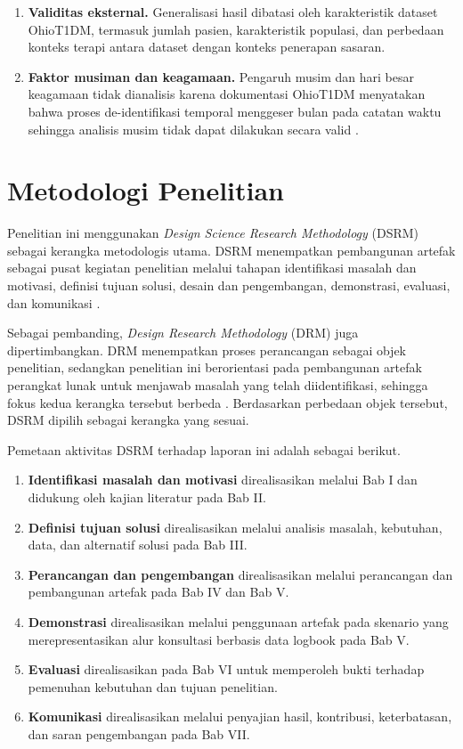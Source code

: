 \begin{enumerate}
    \item \textbf{Validitas eksternal.} Generalisasi hasil dibatasi oleh karakteristik dataset OhioT1DM, termasuk jumlah pasien, karakteristik populasi, dan perbedaan konteks 
    terapi antara dataset dengan konteks penerapan sasaran.

    \item \textbf{Faktor musiman dan keagamaan.} Pengaruh musim dan hari besar keagamaan tidak dianalisis karena dokumentasi OhioT1DM menyatakan bahwa proses de-identifikasi 
    temporal menggeser bulan pada catatan waktu sehingga analisis musim tidak dapat dilakukan secara valid \parencite{marling2020}.
\end{enumerate}

\section{Metodologi Penelitian}
\label{sec:bab1-metodologi}

Penelitian ini menggunakan \textit{Design Science Research Methodology} (DSRM) sebagai kerangka metodologis utama. DSRM menempatkan pembangunan artefak sebagai pusat kegiatan 
penelitian melalui tahapan identifikasi masalah dan motivasi, definisi tujuan solusi, desain dan pengembangan, demonstrasi, evaluasi, dan komunikasi \parencite{peffers2007}.

Sebagai pembanding, \textit{Design Research Methodology} (DRM) juga dipertimbangkan. DRM menempatkan proses perancangan sebagai objek penelitian, sedangkan penelitian ini 
berorientasi pada pembangunan artefak perangkat lunak untuk menjawab masalah yang telah diidentifikasi, sehingga fokus kedua kerangka tersebut berbeda \parencite{blessing2009}. 
Berdasarkan perbedaan objek tersebut, DSRM dipilih sebagai kerangka yang sesuai.

Pemetaan aktivitas DSRM terhadap laporan ini adalah sebagai berikut.

\begin{enumerate}
    \item \textbf{Identifikasi masalah dan motivasi} direalisasikan melalui Bab I dan didukung oleh kajian literatur pada Bab II.
    \item \textbf{Definisi tujuan solusi} direalisasikan melalui analisis masalah, kebutuhan, data, dan alternatif solusi pada Bab III.
    \item \textbf{Perancangan dan pengembangan} direalisasikan melalui perancangan dan pembangunan artefak pada Bab IV dan Bab V.
    \item \textbf{Demonstrasi} direalisasikan melalui penggunaan artefak pada skenario yang merepresentasikan alur konsultasi berbasis data logbook pada Bab V.
    \item \textbf{Evaluasi} direalisasikan pada Bab VI untuk memperoleh bukti terhadap pemenuhan kebutuhan dan tujuan penelitian.
    \item \textbf{Komunikasi} direalisasikan melalui penyajian hasil, kontribusi, keterbatasan, dan saran pengembangan pada Bab VII.
\end{enumerate}

